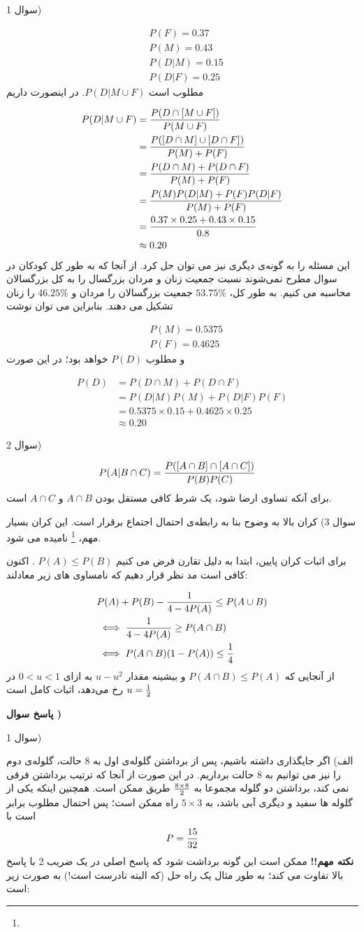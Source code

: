 \documentclass[10pt,letterpaper]{report}
\newcounter{questionanswernumber}
\newcommand{\QA}{
\textbf{پاسخ سوال \thequestionanswernumber)}
\stepcounter{questionanswernumber}
}
\newcommand{\eqn}[1]{
\[\begin{split}
#1
\end{split}\]
}
\begin{document}
سوال 1) 
\eqn{
&
P(F)=0.37
\\&
P(M)=0.43
\\&
P(D|M)=0.15
\\&
P(D|F)=0.25
}{}
مطلوب است 
$
P(D|M\cup F)
$.
 در اینصورت داریم
\eqn{
P(D|M\cup F)&=
{P(D\cap[M\cup F])\over P(M\cup F)}
\\&=
{P([D\cap M]\cup [D\cap F])\over P(M)+P(F)}
\\&=
{P(D\cap M)+P(D\cap F)\over P(M)+P(F)}
\\&=
{P(M)P(D|M)+P(F)P(D|F)\over P(M)+P(F)}
\\&=
{0.37\times 0.25+0.43\times 0.15\over 0.8}
\\&\approx 0.20
}{}
این مسئله را به گونه‌ی دیگری نیز می توان حل کرد. از آنجا که به طور کل کودکان در سوال مطرح نمی‌شوند نسبت جمعیت زنان و مردان بزرگسال را به کل بزرگسالان محاسبه می کنیم. به طور کل، 
$
53.75\%
$
 جمعیت بزرگسالان را مردان و
$
46.25\%
$
 را زنان تشکیل می دهند. بنابراین می توان نوشت
\eqn{
&
P(M)=0.5375
\\&
P(F)=0.4625
}{}
و مطلوب 
$
P(D)
$
 خواهد بود؛ در این صورت
\eqn{
P(D)&=
P(D\cap M)+P(D\cap F)
\\&=
P(D|M)P(M)+P(D|F)P(F)
\\&=
0.5375\times 0.15+0.4625\times 0.25
\\&\approx 0.20
}{}

سوال 2)
\eqn{
P(A|B\cap C)&=
{P([A\cap B]\cap [A\cap C])\over P(B)P(C)}
}{}
برای آنکه تساوی ارضا شود، یک شرط کافی مستقل بودن $A\cap B$ و $A\cap C$ است.

سوال 3) کران بالا به وضوح بنا به رابطه‌ی احتمال اجتماع برقرار است. این کران بسیار مهم، \textbf{}
\footnote{
}
 نامیده می شود.

برای اثبات کران پایین، ابتدا به دلیل تقارن فرض می کنیم 
$
P(A)\le P(B)
$
. اکنون کافی است مد نظر قرار دهیم که نامساوی های زیر معادلند:
\eqn{
&
P(A)+P(B)-{1\over 4-4P(A)}\le P(A\cup B)
\\& \iff
{1\over 4-4P(A)}\ge P(A\cap B)
\\& \iff
P(A\cap B)(1-P(A))\le {1\over 4}
}{}
از آنجایی که $
P(A\cap B)\le P(A)
$
 و بیشینه مقدار $u-u^2$ به ازای $0<u<1$ در $u={1\over 2}$ رخ می‌دهد، اثبات کامل است

\QA

سوال 1) 

الف) اگر جایگذاری داشته باشیم، پس از برداشتن گلوله‌ی اول به 8 حالت، گلوله‌ی دوم را نیز می توانیم به 8 حالت برداریم. در این صورت از آنجا که ترتیب برداشتن فرقی نمی کند، برداشتن دو گلوله مجموعا به 
$
8\times 8\over 2
$
طریق ممکن است. همچنین اینکه یکی از گلوله ها سفید و دیگری آبی باشد، به 
$
5\times 3
$
راه ممکن است؛ پس احتمال مطلوب برابر است با
$$
P={15\over 32}
$$
\textbf{نکته مهم!!}
ممکن است این گونه برداشت شود که پاسخ اصلی در یک ضریب 2 با پاسخ بالا تفاوت می کند؛ به طور مثال یک راه حل (که البته نادرست است!) به صورت زیر است:
\end{document}
